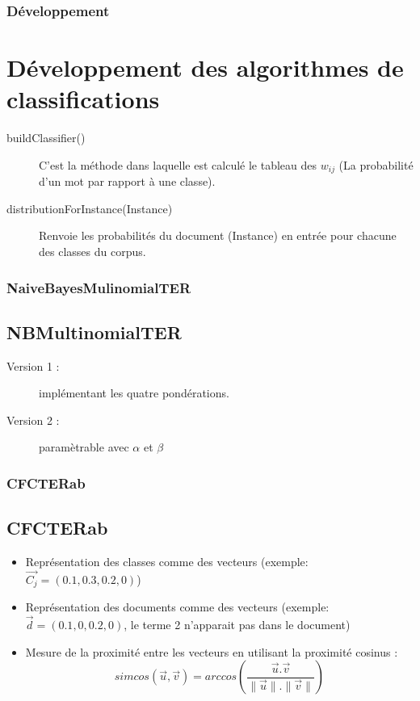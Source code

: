 \documentclass[12pt]{beamer}
\begin{document}
\begin{frame}
\frametitle{Développement}
\section{Développement des algorithmes de classifications}
\begin{description}
\item[buildClassifier()]  C'est la méthode dans laquelle est calculé le tableau des $w_{ij}$ (La probabilité d'un mot par rapport à une classe).
\item[distributionForInstance(Instance)] Renvoie les probabilités du document (Instance) en entrée pour chacune des classes du corpus.
\end{description}


\end{frame}




\begin{frame}
\frametitle{NaiveBayesMulinomialTER}
\subsection{NBMultinomialTER}
\begin{description}
\item[Version 1 : ]  implémentant les quatre pondérations.
\item[Version 2 : ] paramètrable avec $\alpha$ et $\beta$
\end{description}


\end{frame}

\begin{frame}
\frametitle{CFCTERab}
\subsection{CFCTERab}
\begin{itemize}
\item Représentation des classes comme des vecteurs (exemple: $\vec{C_j} = (0.1,0.3,0.2,0)$)
\item Représentation des documents comme des vecteurs (exemple: $\vec{d} = (0.1,0,0.2,0)$, le terme 2 n'apparait pas dans le document)
\item Mesure de la proximité entre les vecteurs en utilisant la proximité cosinus :
\[simcos(\vec{u},\vec{v}) = arccos( \frac{\vec{u}.\vec{v}}{\|\vec{u}\|.\|\vec{v}\|})\]
\end{itemize}



\end{frame}
\end{document}
